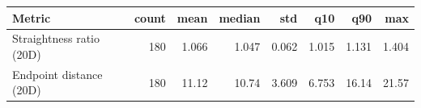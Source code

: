 \begin{tabular}{lrrrrrrr}
\toprule
Metric & count & mean & median & std & q10 & q90 & max \\
\midrule
Straightness ratio (20D) & 180 & 1.066 & 1.047 & 0.062 & 1.015 & 1.131 & 1.404 \\
Endpoint distance (20D) & 180 & 11.12 & 10.74 & 3.609 & 6.753 & 16.14 & 21.57 \\
\bottomrule
\end{tabular}
